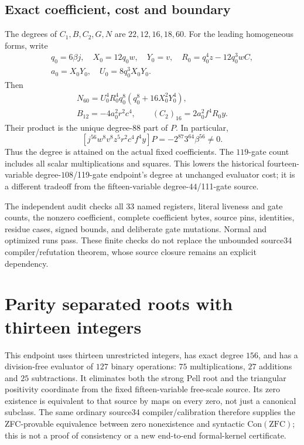 \documentclass[11pt]{article}
\begin{document}
\subsection{Exact coefficient, cost and boundary}
The degrees of $C_1,B,C_2,G,N$ are $22,12,16,18,60$.
For the leading homogeneous forms, write
\begin{gather*}
 q_0=6\beta j,\quad X_0=12q_0w,\quad Y_0=v,\quad
 R_0=q_0^4z-12q_0^3wC,\\
 a_0=X_0Y_0,\quad U_0=8q_0^3X_0Y_0.
\end{gather*}
Then
\begin{gather*}
 N_{60}=U_0^4R_0^4q_0^8(q_0^8+16X_0^2Y_0^4),\\
 B_{12}=-4a_0^2r^2c^4,\qquad (C_2)_{16}=2a_0^2f^4R_0y.
\end{gather*}
Their product is the unique degree-$88$ part of $P$. In particular,
\[
 [j^{56}w^8v^8z^5r^2c^4f^4y]P
       =-2^{87}3^{64}\beta^{56}\ne0.
\]
Thus the degree is attained on the actual fixed coefficients. The $119$-gate
count includes all scalar multiplications and squares. This lowers the historical
fourteen-variable degree-$108$/119-gate endpoint's degree at unchanged evaluator
cost; it is a different tradeoff from the fifteen-variable degree-$44$/111-gate
source.

The independent audit checks all 33 named registers, literal liveness and gate
counts, the nonzero coefficient, complete coefficient bytes, source pins,
identities, residue cases, signed bounds, and deliberate gate mutations. Normal
and optimized runs pass. These finite checks do not replace the unbounded source34
compiler/refutation theorem, whose source closure remains an explicit dependency.
\section{Parity separated roots with thirteen integers}
\label{sec:parity-three-root13}
This endpoint uses thirteen unrestricted integers, has exact degree $156$, and
has a division-free evaluator of $127$ binary operations: $75$ multiplications,
$27$ additions and $25$ subtractions. It eliminates both the strong Pell root and
the triangular positivity coordinate from the fixed fifteen-variable free-scale
source. Its zero existence is equivalent to that source by maps on every zero,
not just a canonical subclass. The same ordinary source34 compiler/calibration
therefore supplies the ZFC-provable equivalence between zero nonexistence and
syntactic $\mathrm{Con}(\mathrm{ZFC})$; this is not a proof of consistency or a new
end-to-end formal-kernel certificate.
\end{document}
